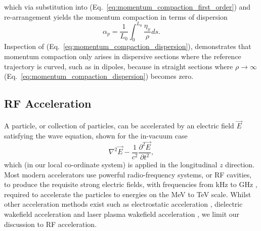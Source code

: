 \documentclass[../main.tex]{subfiles}
\begin{document}
which via substitution into (Eq.~\ref{eq:momentum_compaction_first_order}) and re-arrangement yields the momentum compaction in terms of dispersion
\begin{equation}
\alpha_{p} = \frac{1}{L_{0}}\int_{0}^{L_{0}}\frac{\eta_{x}}{\rho}ds.
\label{eq:momentum_compaction_dispersion}    
\end{equation}
Inspection of (Eq.~\ref{eq:momentum_compaction_dispersion}), demonstrates that momentum compaction only arises in dispersive sections where the reference trajectory is curved, such as in dipoles, because in straight sections where $\rho\rightarrow\infty$ (Eq.~\ref{eq:momentum_compaction_dispersion}) becomes zero.

\subsection{RF Acceleration}
\label{sec:RF_acceleration}

A particle, or collection of particles, can be accelerated by an electric field $\overrightarrow{E}$ satisfying the wave equation, shown for the in-vacuum case 
\begin{equation}
\nabla^{2}\overrightarrow{E}-\frac{1}{c^{2}}\frac{\partial^{2}\overrightarrow{E}}{\partial t^{2}},
\label{eq:electromagnetic_wave_equation}    
\end{equation}
which (in our local co-ordinate system) is applied in the longitudinal $z$ direction. Most modern accelerators use powerful radio-frequency systems, or RF cavities, to produce the requisite strong electric fields, with frequencies from \si{\kilo\hertz} to \si{\giga\hertz} \cite{wille2000physics}, required to accelerate the particles to energies on the \si{\mega\electronvolt} to \si{\tera\electronvolt} scale. Whilst other acceleration methods exist such as electrostatic acceleration \cite{bromley1974development}, dielectric wakefield acceleration \cite{mtingwa1990theory} and laser plasma wakefield acceleration \cite{sprangle1988laser,esarey2009physics}, we limit our discussion to RF acceleration.
\end{document}
